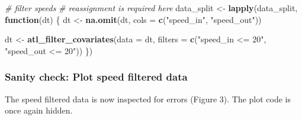 \documentclass[
]{scrartcl}
\newenvironment{Shaded}{}{}
\newcommand{\CommentTok}[1]{\textcolor[rgb]{0.38,0.63,0.69}{\textit{#1}}}
\newcommand{\ControlFlowTok}[1]{\textcolor[rgb]{0.00,0.44,0.13}{\textbf{#1}}}
\newcommand{\DataTypeTok}[1]{\textcolor[rgb]{0.56,0.13,0.00}{#1}}
\newcommand{\KeywordTok}[1]{\textcolor[rgb]{0.00,0.44,0.13}{\textbf{#1}}}
\newcommand{\NormalTok}[1]{#1}
\newcommand{\StringTok}[1]{\textcolor[rgb]{0.25,0.44,0.63}{#1}}
\begin{document}
\begin{Shaded}
\begin{Highlighting}[]
\CommentTok{\# filter speeds}
\CommentTok{\# reassignment is required here}
\NormalTok{data\_split <{-}}\StringTok{ }\KeywordTok{lapply}\NormalTok{(data\_split, }\ControlFlowTok{function}\NormalTok{(dt) \{}
\NormalTok{  dt <{-}}\StringTok{ }\KeywordTok{na.omit}\NormalTok{(dt, }\DataTypeTok{cols =} \KeywordTok{c}\NormalTok{(}\StringTok{"speed\_in"}\NormalTok{, }\StringTok{"speed\_out"}\NormalTok{))}
  
\NormalTok{  dt <{-}}\StringTok{ }\KeywordTok{atl\_filter\_covariates}\NormalTok{(}\DataTypeTok{data =}\NormalTok{ dt,}
                              \DataTypeTok{filters =} \KeywordTok{c}\NormalTok{(}\StringTok{"speed\_in <= 20"}\NormalTok{,}
                                          \StringTok{"speed\_out <= 20"}\NormalTok{))}
\NormalTok{\})}
\end{Highlighting}
\end{Shaded}

\hypertarget{sanity-check-plot-speed-filtered-data}{%
\subsubsection{Sanity check: Plot speed filtered data}\label{sanity-check-plot-speed-filtered-data}}

The speed filtered data is now inspected for errors (Figure 3). The plot code is once again hidden.
\end{document}
